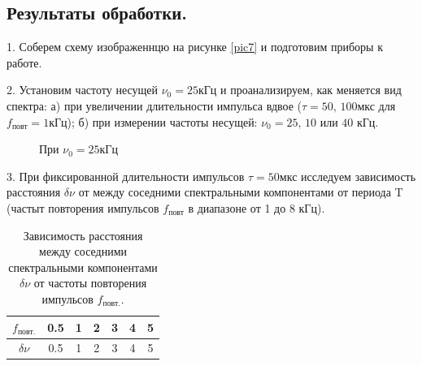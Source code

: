\documentclass[a4paper,12pt]{article} %
\begin{document}
\subsection{Результаты обработки.}

1. Соберем схему изображеннцю на рисунке \eqref{pic7} и подготовим приборы к работе.

2. Установим частоту несущей $\nu_0 = 25\text{кГц}$ и проанализируем, как меняется вид спектра: а) при увеличении длительности импульса вдвое ($\tau = 50\text{, } 100 \text{мкс}$ для $f_\text{повт} = 1 \text{кГц}$); б) при измерении частоты несущей: $\nu_0 = 25 \text{, } 10 \text{ или } 40 \text{ кГц}$.

\begin{figure}[H]\label{pic8}
 	\caption{При $\nu_0 = 25 \text{кГц}$}
\end{figure}

3. При фиксированной длительности импульсов $\tau = 50 \text{мкс}$ исследуем зависимость расстояния $\delta \nu$ от между соседними спектральными компонентами от периода T (частыт повторения импульсов $f_\text{повт}$ в диапазоне от 1 до 8 кГц).

\begin{table}[H]
\caption{\label{tab4} Зависимость расстояния между соседними спектральными компонентами $\delta \nu$ от частоты повторения импульсов $f_\text{повт.}$.}
\begin{center}
\begin{tabular}{|c|c|c|c|c|c|c|}
\hline
$f_\text{повт.}$ & 0.5 & 1 & 2 & 3 & 4 & 5\\
\hline
$\delta \nu$ & 0.5 & 1 & 2 & 3 & 4 & 5\\
\hline
\end{tabular}
\end{center}
\label{tab4}
\end{table}
\end{document}
